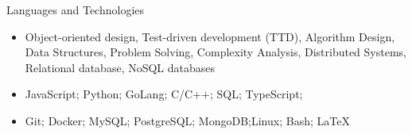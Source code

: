\documentclass[]{cv}
\begin{document}
	\begin{cvsection}{Languages and Technologies}
					\vspace{3mm}

		\begin{cvsubsection}{}{}{}	
			\begin{itemize}
				\item Object-oriented design, Test-driven development (TTD), Algorithm Design, Data Structures, Problem Solving, Complexity Analysis, Distributed Systems, Relational database, NoSQL databases
				\item JavaScript; Python; GoLang; C/C++; SQL; TypeScript; 
				\item Git; Docker; MySQL; PostgreSQL; MongoDB;Linux; Bash; LaTeX
			\end{itemize}
		\end{cvsubsection}
	\end{cvsection}
	
\end{document}
